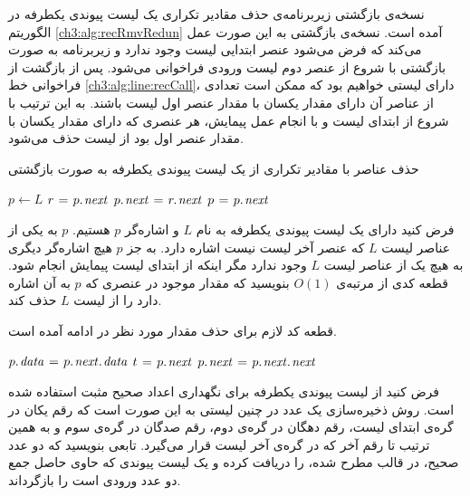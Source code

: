 نسخه‌ی بازگشتی زیربرنامه‌ی حذف مقادیر تکراری یک لیست پیوندی یکطرفه در الگوریتم {\eqref{ch3:alg:recRmvRedun}} آمده است. نسخه‌ی بازگشتی به این صورت عمل می‌کند که فرض می‌شود عنصر ابتدایی لیست وجود ندارد و زیربرنامه به صورت بازگشتی با شروع از عنصر دوم لیست ورودی فراخوانی می‌شود. پس از بازگشت از فراخوانی خط {\ref{ch3:alg:line:recCall}}، دارای لیستی خواهیم بود که ممکن است تعدادی از عناصر آن دارای مقدار یکسان با مقدار عنصر اول لیست باشند. به این ترتیب با شروع از ابتدای لیست و با انجام عمل پیمایش، هر عنصری که دارای مقدار یکسان با مقدار عنصر اول بود از لیست حذف می‌شود.
\begin{algorithm}
\caption{حذف عناصر با مقادیر تکراری از یک لیست پیوندی یکطرفه به صورت بازگشتی}\label{ch3:alg:recRmvRedun}
\begin{latin}
\begin{algorithmic}[1]
				\State	\Return
		\EndIf
		\State	{}\label{ch3:alg:line:recCall}
		\State	$p \gets L$
						\State	$r \mathrel{\hspace{1pt}=\hspace{1pt}} p.\hspace*{1pt}\mathit{next}$
						\State	$p.\hspace*{1pt}\mathit{next} \mathrel{\hspace{1pt}=\hspace{1pt}} r.\hspace*{1pt}\mathit{next}$
						\State	{}
				\Else
						\State	$p \mathrel{\hspace{1pt}=\hspace{1pt}} p.\hspace*{1pt}\mathit{next}$
				\EndIf
		\EndWhile			
\EndProcedure
\end{algorithmic}
\end{latin}
\end{algorithm}

 فرض کنید دارای یک لیست پیوندی یکطرفه به نام {$L$} و اشاره‌گر {$p$} هستیم. {$p$} به یکی از عناصر لیست {$L$} که عنصر آخر لیست نیست اشاره دارد. به جز {$p$} هیچ اشاره‌گر دیگری به هیچ یک از عناصر لیست {$L$} وجود ندارد مگر اینکه از ابتدای لیست پیمایش انجام شود. قطعه کدی از مرتبه‌ی {$O(1)$} بنویسید که مقدار موجود در عنصری که {$p$} به آن اشاره دارد را از لیست {$L$} حذف کند.


قطعه کد لازم برای حذف مقدار مورد نظر در ادامه آمده است.
\begin{latin}
\begin{algorithmic}[1]
		\State	$p.\hspace*{1pt}\mathit{data} \mathrel{\hspace{1pt}=\hspace{1pt}} p.\hspace*{1pt}\mathit{next}.\hspace*{1pt}\mathit{data}$
		\State	$t \mathrel{\hspace{1pt}=\hspace{1pt}} p.\hspace*{1pt}\mathit{next}$
		\State	$p.\hspace*{1pt}\mathit{next} \mathrel{\hspace{1pt}=\hspace{1pt}} p.\hspace*{1pt}\mathit{next}.\hspace*{1pt}\mathit{next}$
		\State	{}
\end{algorithmic}
\end{latin}

 فرض کنید از لیست پیوندی یکطرفه برای نگهداری اعداد صحیح مثبت استفاده شده است. روش ذخیره‌سازی یک عدد در چنین لیستی به این صورت است که رقم یکان در گره‌ی ابتدای لیست، رقم دهگان در گره‌ی دوم، رقم صدگان در گره‌ی سوم و به همین ترتیب تا رقم آخر که در گره‌ی آخر لیست قرار می‌گیرد. تابعی بنویسید که دو عدد صحیح، در قالب مطرح شده، را دریافت کرده و یک لیست پیوندی که حاوی حاصل جمع دو عدد ورودی است را بازگرداند.

